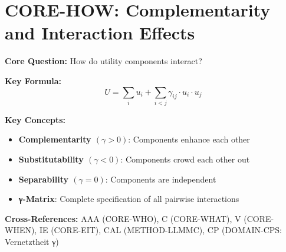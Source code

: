 
\chapter{CORE-HOW: Complementarity and Interaction Effects}
\label{app:core-how}

\begin{abstract}
This appendix answers the third fundamental question of the Evidence-Based Framework:
\textit{``How do utility components interact?''} Standard economics assumes additive
separability --- components contribute independently. We reject this assumption and
formalize the complementarity parameter $\gamma_{ij} \in [-1, +1]$, capturing synergies
($\gamma > 0$) and crowding-out ($\gamma < 0$) between utility dimensions and welfare
levels. The axiom system UNMAPPED_CMP-1 through UNMAPPED_CMP-10 provides the formal foundations.
This interaction structure is essential for understanding non-concave utility,
intervention portfolio design, and emergence phenomena.
\end{abstract}


\begin{tcolorbox}[colback=blue!5!white, colframe=blue!75!black,
    title=Quick Reference: CORE-HOW]

\textbf{Core Question:} How do utility components interact?

\textbf{Key Formula:}
\begin{equation}
U = \sum_i u_i + \sum_{i < j} \gamma_{ij} \cdot u_i \cdot u_j
\label{eq:how-utility}
\end{equation}

\textbf{Key Concepts:}
\begin{itemize}[nosep]
\item \textbf{Complementarity $(\gamma > 0)$}: Components enhance each other
\item \textbf{Substitutability $(\gamma < 0)$}: Components crowd each other out
\item \textbf{Separability $(\gamma = 0)$}: Components are independent
\item \textbf{γ-Matrix}: Complete specification of all pairwise interactions
\end{itemize}

\textbf{Cross-References:}
AAA (CORE-WHO), C (CORE-WHAT), V (CORE-WHEN), IE (CORE-EIT), CAL (METHOD-LLMMC), CP (DOMAIN-CPS: Vernetztheit γ)

\end{tcolorbox}


